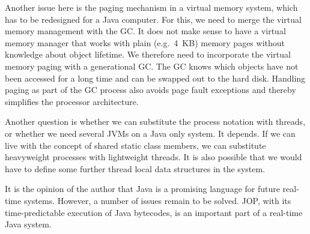 \begin{description}
Another issue here is the paging mechanism in a virtual memory
system, which has to be redesigned for a Java computer. For this,
we need to merge the virtual memory management with the GC. It
does not make sense to have a virtual memory manager that works
with plain (e.g.\ 4~KB) memory pages without knowledge about
object lifetime. We therefore need to incorporate the virtual
memory paging with a generational GC. The GC knows which objects
have not been accessed for a long time and can be swapped out to
the hard disk. Handling paging as part of the GC process also
avoids page fault exceptions and thereby simplifies the processor
architecture.

Another question is whether we can substitute the process
notation with threads, or whether we need several JVMs on a Java
only system. It depends. If we can live with the concept of
shared static class members, we can substitute heavyweight
processes with lightweight threads. It is also possible that we
would have to define some further thread local data structures in
the system.

\end{description}
%
It is the opinion of the author that Java is a promising language for
future real-time systems. However, a number of issues remain to be
solved. JOP, with its time-predictable execution of Java bytecodes,
is an important part of a real-time Java system.
